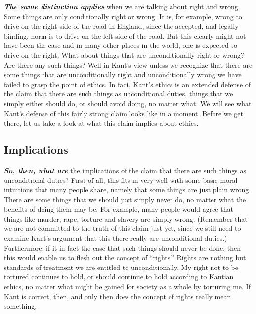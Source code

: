 \documentclass[
  12pt, openany]{book}
\theoremstyle{definition}
\theoremstyle{definition}
\theoremstyle{definition}
\theoremstyle{remark}
\begin{document}
\textbf{\emph{The same distinction applies}} when we are talking about right and wrong. Some things are only conditionally right or wrong. It is, for example, wrong to drive on the right side of the road in England, since the accepted, and legally binding, norm is to drive on the left side of the road. But this clearly might not have been the case and in many other places in the world, one is expected to drive on the right. What about things that are unconditionally right or wrong? Are there any such things? Well in Kant's view unless we recognize that there are some things that are unconditionally right and unconditionally wrong we have failed to grasp the point of ethics. In fact, Kant's ethics is an extended defense of the claim that there are such things as unconditional duties, things that we simply either should do, or should avoid doing, no matter what. We will see what Kant's defense of this fairly strong claim looks like in a moment. Before we get there, let us take a look at what this claim implies about ethics.

\hypertarget{implications}{%
\subsection*{Implications}\label{implications}}


\textbf{\emph{So, then, what are}} the implications of the claim that there are such things as unconditional duties? First of all, this fits in very well with some basic moral intuitions that many people share, namely that some things are just plain wrong. There are some things that we should just simply never do, no matter what the benefits of doing them may be. For example, many people would agree that things like murder, rape, torture and slavery are simply wrong. (Remember that we are not committed to the truth of this claim just yet, since we still need to examine Kant's argument that this there really are unconditional duties.) Furthermore, if it in fact the case that such things should never be done, then this would enable us to flesh out the concept of ``rights.'' Rights are nothing but standards of treatment we are entitled to unconditionally. My right not to be tortured continues to hold, or should continue to hold according to Kantian ethics, no matter what might be gained for society as a whole by torturing me. If Kant is correct, then, and only then does the concept of rights really mean something.
\end{document}
